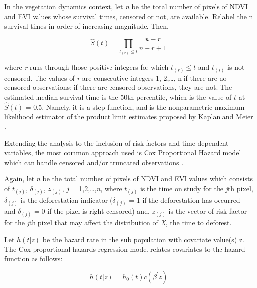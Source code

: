 
In the vegetation dynamics context, let \textit{n} be the total number of pixels of NDVI and EVI values whose survival times, censored or not, are available. Relabel the n survival times in order of increasing magnitude. Then,

\begin{center}
\begin{equation}
\hat{S}(t) = \prod_{t_{(r)} \leq t} \frac{n-r}{n-r + 1}\label{eq:3} 
\end{equation}
\end{center}

where \textit{r} runs through those positive integers for which $t_{(r)} \leq t$ and $t_{(r)}$ is not censored. The values of \textit{r} are consecutive integers 1, 2,\dots , n if there are no censored observations; if there are censored observations, they are not. The estimated median survival time is the 50th percentile, which is the value of $t$ at $\hat{S}(t)$ = 0.5. Namely, it is a step function, and is the nonparametric maximum-likelihood estimator of the product limit estimates proposed by Kaplan and Meier \citep{lee_wang_2003}.


Extending the analysis to the inclusion of risk factors and time dependent variables, the most common approach used is Cox Proportional Hazard model which can handle censored and/or truncated observations \citep{Cox1972,cao_2005}. 

Again, let \textit{n} be the total number of pixels of NDVI and EVI values which consists of $t_{(j)}$, $\delta_{(j)}$, $z_{(j)}$, $\textit{j}$ = 1,2,\dots,\textit{n}, where $t_{(j)}$ is
the time on study for the \textit{j}th pixel, $\delta_{(j)}$ is the deforestation indicator ($\delta_{(j)}$ = 1 if the deforestation has occurred and $\delta_{(j)}$ = 0 if the pixel is right-censored) and, $z_{(j)}$ is the vector of risk factor for the \textit{j}th pixel that may affect the distribution of \textit{X}, the time to deforest.

Let $h(t|z)$ be the hazard rate in the sub population with covariate value(s) z. The Cox proportional hazards regression model relates covariates to the hazard function as follows:

\begin{center}
\begin{equation}
h(t|z) = h_{0}(t)c(\beta^{'}z) \label{eq:4} 
\end{equation}
\end{center}

